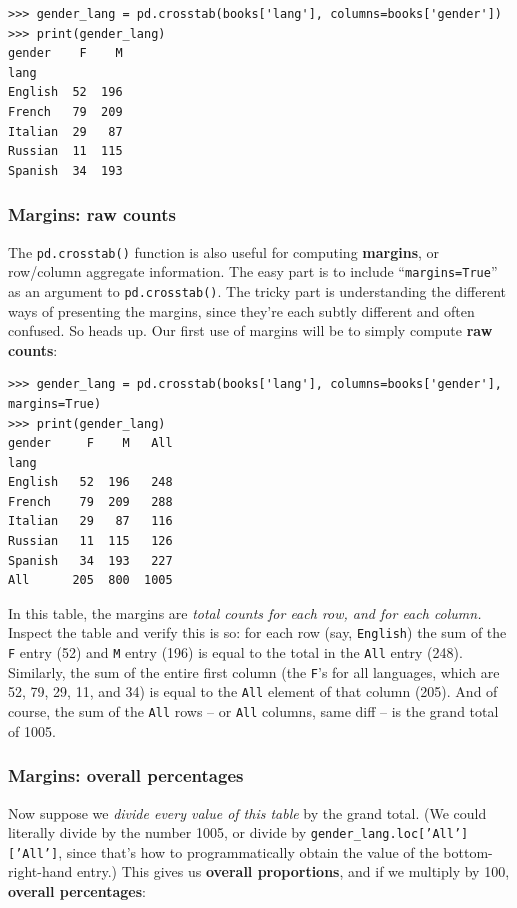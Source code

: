 \begin{Verbatim}[fontsize=\scriptsize,samepage=true,frame=single]
>>> gender_lang = pd.crosstab(books['lang'], columns=books['gender'])
>>> print(gender_lang)
gender    F    M
lang            
English  52  196
French   79  209
Italian  29   87
Russian  11  115
Spanish  34  193
\end{Verbatim}

\subsubsection{Margins: raw counts}
\label{marginsBegin}

The \texttt{pd.crosstab()} function is also useful for computing
\textbf{margins}, or row/column aggregate information. The easy part is to
include ``\texttt{margins=True}'' as an argument to \texttt{pd.crosstab()}. The
tricky part is understanding the different ways of presenting the margins,
since they're each subtly different and often confused. So heads up. Our first
use of margins will be to simply compute \textbf{raw counts}:

\begin{Verbatim}[fontsize=\scriptsize,samepage=true,frame=single]
>>> gender_lang = pd.crosstab(books['lang'], columns=books['gender'], margins=True)
>>> print(gender_lang)
gender     F    M   All
lang                   
English   52  196   248
French    79  209   288
Italian   29   87   116
Russian   11  115   126
Spanish   34  193   227
All      205  800  1005
\end{Verbatim}

In this table, the margins are \textit{total counts for each row, and for each
column.} Inspect the table and verify this is so: for each row (say,
\texttt{English}) the sum of the \texttt{F} entry (52) and \texttt{M} entry
(196) is equal to the total in the \texttt{All} entry (248). Similarly, the sum
of the entire first column (the \texttt{F}'s for all languages, which are 52,
79, 29, 11, and 34) is equal to the \texttt{All} element of that column (205).
And of course, the sum of the \texttt{All} rows -- or \texttt{All} columns,
same diff -- is the grand total of 1005.

\subsubsection{Margins: overall percentages}

Now suppose we \textit{divide every value of this table} by the grand total.
(We could literally divide by the number 1005, or divide by
\texttt{gender\_lang.loc['All']['All']}, since that's how to programmatically
obtain the value of the bottom-right-hand entry.) This gives us \textbf{overall
proportions}, and if we multiply by 100, \textbf{overall percentages}:

